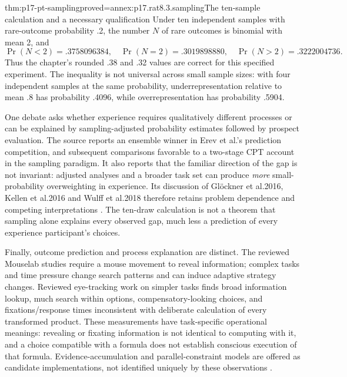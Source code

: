 \begin{hblemma}{thm:p17-pt-sampling}{proved=annex:p17.rat8.3.sampling}{The ten-sample calculation and a necessary qualification}
Under ten independent samples with rare-outcome probability .2,
the number \(N\) of rare outcomes is binomial with mean 2, and
\[
 \Pr(N<2)=.3758096384,\quad
 \Pr(N=2)=.3019898880,\quad
 \Pr(N>2)=.3222004736.
\]
Thus the chapter's rounded .38 and .32 values are correct for
this specified experiment. The inequality is not universal across
small sample sizes: with four independent samples at the same
probability, underrepresentation relative to mean .8 has probability
.4096, while overrepresentation has probability .5904.
\end{hblemma}

One debate asks whether experience requires qualitatively different
processes or can be explained by sampling-adjusted probability
estimates followed by prospect evaluation. The source reports an
ensemble winner in Erev et al.'s prediction competition, and subsequent
comparisons favorable to a two-stage CPT account in the sampling
paradigm. It also reports that the familiar direction of the gap is
not invariant: adjusted analyses and a broader task set can produce
\emph{more} small-probability overweighting in experience. Its
discussion of Gl\"ockner et al.2016, Kellen et al.2016 and
Wulff et al.2018 therefore retains problem dependence and competing
interpretations \cite[p.~490]{Glockner2021ProspectTheory}.
The ten-draw calculation is not a theorem that sampling alone
explains every observed gap, much less a prediction of every
experience participant's choices.

Finally, outcome prediction and process explanation are distinct.
The reviewed Mouselab studies require a mouse movement to reveal
information; complex tasks and time pressure change search patterns
and can induce adaptive strategy changes. Reviewed eye-tracking work
on simpler tasks finds broad information lookup, much search within
options, compensatory-looking choices, and fixations/response times
inconsistent with deliberate calculation of every transformed product.
These measurements have task-specific operational meanings: revealing
or fixating information is not identical to computing with it, and a
choice compatible with a formula does not establish conscious execution
of that formula. Evidence-accumulation and parallel-constraint models
are offered as candidate implementations, not identified uniquely by
these observations \cite[pp.~490--491]{Glockner2021ProspectTheory}.

